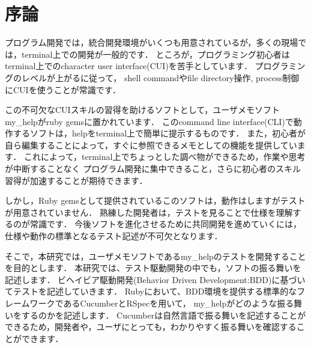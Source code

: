 \section{序論}
プログラム開発では，統合開発環境がいくつも用意されているが，多くの現場では，terminal上での開発が一般的です．
ところが，プログラミング初心者はterminal上でのcharacter user interface(CUI)を苦手としています．
プログラミングのレベルが上がるに従って，
shell commandやfile directory操作, process制御にCUIを使うことが常識です．

この不可欠なCUIスキルの習得を助けるソフトとして，ユーザメモソフトmy\_helpがruby gemsに置かれています．
このcommand line interface(CLI)で動作するソフトは，helpをterminal上で簡単に提示するものです．
また，初心者が自ら編集することによって，すぐに参照できるメモとしての機能を提供しています．
これによって，terminal上でちょっとした調べ物ができるため，作業や思考が中断することなく
プログラム開発に集中できること，さらに初心者のスキル習得が加速することが期待できます．

しかし，Ruby gemsとして提供されているこのソフトは，動作はしますがテストが用意されていません．
熟練した開発者は，テストを見ることで仕様を理解するのが常識です．
今後ソフトを進化させるために共同開発を進めていくには，仕様や動作の標準となるテスト記述が不可欠となります．

そこで，本研究では，ユーザメモソフトであるmy\_helpのテストを開発することを目的とします．
本研究では、テスト駆動開発の中でも，ソフトの振る舞いを記述します．
ビヘイビア駆動開発(Behavior Driven Development:BDD)に基づいてテストを記述していきます．
Rubyにおいて、BDD環境を提供する標準的なフレームワークであるCucumberとRSpecを用いて，
my\_helpがどのような振る舞いをするのかを記述します．
Cucumberは自然言語で振る舞いを記述することができるため，開発者や，ユーザにとっても，わかりやすく振る舞いを確認することができます．

